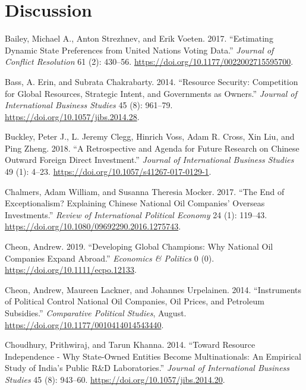 \documentclass[11pt,]{book}
\begin{document}
\hypertarget{conclusion01}{%
\section{Discussion}\label{conclusion01}}

\hypertarget{refs}{}
\leavevmode\hypertarget{ref-bailey_estimating_2017}{}%
Bailey, Michael A., Anton Strezhnev, and Erik Voeten. 2017. ``Estimating Dynamic State Preferences from United Nations Voting Data.'' \emph{Journal of Conflict Resolution} 61 (2): 430--56. \url{https://doi.org/10.1177/0022002715595700}.

\leavevmode\hypertarget{ref-bass_resource_2014}{}%
Bass, A. Erin, and Subrata Chakrabarty. 2014. ``Resource Security: Competition for Global Resources, Strategic Intent, and Governments as Owners.'' \emph{Journal of International Business Studies} 45 (8): 961--79. \url{https://doi.org/10.1057/jibs.2014.28}.

\leavevmode\hypertarget{ref-buckley_retrospective_2018}{}%
Buckley, Peter J., L. Jeremy Clegg, Hinrich Voss, Adam R. Cross, Xin Liu, and Ping Zheng. 2018. ``A Retrospective and Agenda for Future Research on Chinese Outward Foreign Direct Investment.'' \emph{Journal of International Business Studies} 49 (1): 4--23. \url{https://doi.org/10.1057/s41267-017-0129-1}.

\leavevmode\hypertarget{ref-chalmers_end_2017}{}%
Chalmers, Adam William, and Susanna Theresia Mocker. 2017. ``The End of Exceptionalism? Explaining Chinese National Oil Companies' Overseas Investments.'' \emph{Review of International Political Economy} 24 (1): 119--43. \url{https://doi.org/10.1080/09692290.2016.1275743}.

\leavevmode\hypertarget{ref-cheon_developing_2019}{}%
Cheon, Andrew. 2019. ``Developing Global Champions: Why National Oil Companies Expand Abroad.'' \emph{Economics \& Politics} 0 (0). \url{https://doi.org/10.1111/ecpo.12133}.

\leavevmode\hypertarget{ref-cheon_instruments_2014}{}%
Cheon, Andrew, Maureen Lackner, and Johannes Urpelainen. 2014. ``Instruments of Political Control National Oil Companies, Oil Prices, and Petroleum Subsidies.'' \emph{Comparative Political Studies}, August. \url{https://doi.org/10.1177/0010414014543440}.

\leavevmode\hypertarget{ref-choudhury_toward_2014}{}%
Choudhury, Prithwiraj, and Tarun Khanna. 2014. ``Toward Resource Independence - Why State-Owned Entities Become Multinationals: An Empirical Study of India's Public R\&D Laboratories.'' \emph{Journal of International Business Studies} 45 (8): 943--60. \url{https://doi.org/10.1057/jibs.2014.20}.
\end{document}
